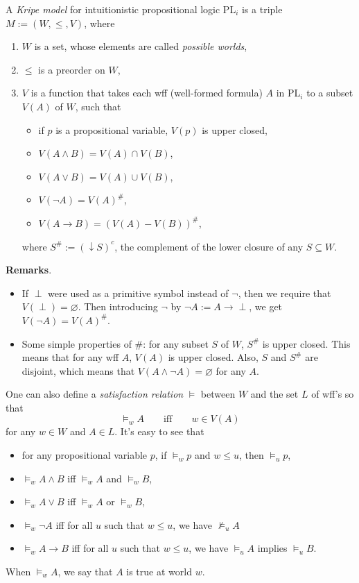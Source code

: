 \documentclass[12pt]{article}
\begin{document}
A \emph{Kripe model} for intuitionistic propositional logic PL$_i$ is a triple $M:=(W,\le,V)$, where 
\begin{enumerate}
\item $W$ is a set, whose elements are called \emph{possible worlds},
\item $\le$ is a preorder on $W$, 
\item $V$ is a function that takes each wff (well-formed formula) $A$ in PL$_i$ to a subset $V(A)$ of $W$, such that
\begin{itemize}
\item if $p$ is a propositional variable, $V(p)$ is upper closed,
\item $V(A\land B)=V(A)\cap V(B)$,
\item $V(A\lor B)=V(A)\cup V(B)$,
\item $V(\neg A)=V(A)^{\#}$,
\item $V(A\to B)=(V(A)- V(B))^{\#}$,
\end{itemize}
where $S^{\#}:=(\downarrow\!\! S)^c$, the complement of the lower closure of any $S \subseteq W$.
\end{enumerate}

\textbf{Remarks}.  
\begin{itemize}
\item
If $\perp$ were used as a primitive symbol instead of $\neg$, then we require that $V(\perp)=\varnothing$.  Then introducing $\neg$ by $\neg A := A\to \perp$, we get $V(\neg A)=V(A)^{\#}$.
\item
Some simple properties of $\#$: for any subset $S$ of $W$, $S^{\#}$ is upper closed.  This means that for any wff $A$, $V(A)$ is upper closed.  Also, $S$ and $S^{\#}$ are disjoint, which means that $V(A\land \neg A)=\varnothing$ for any $A$.
\end{itemize}

One can also define a \emph{satisfaction relation} $\models$ between $W$ and the set $L$ of wff's so that 
$$\models_w A \qquad \mbox{iff} \qquad w\in V(A)$$
for any $w\in W$ and $A\in L$.  It's easy to see that
\begin{itemize}
\item for any propositional variable $p$, if $\models_w p$ and $w\le u$, then $\models_u p$,
\item $\models_w A\land B$ iff $\models_w A$ and $\models_w B$,
\item $\models_w A\lor B$ iff $\models_w A$ or $\models_w B$,
\item $\models_w \neg A$ iff for all $u$ such that $w\le u$, we have $\not \models_u A$
\item $\models_w A\to B$ iff for all $u$ such that $w\le u$, we have $\models_u A$ implies $\models_u B$.
\end{itemize}
When $\models_w A$, we say that $A$ is true at world $w$.
\end{document}
